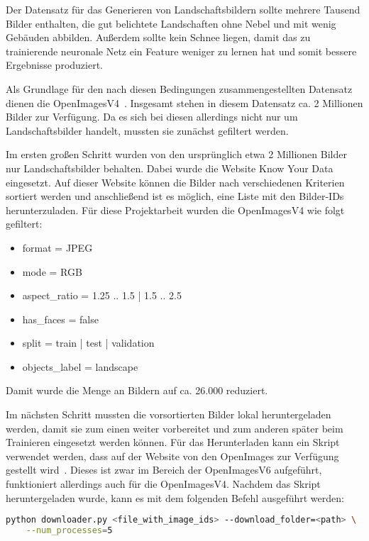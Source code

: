 Der Datensatz für das Generieren von Landschaftsbildern sollte mehrere Tausend
Bilder enthalten, die gut belichtete Landschaften ohne Nebel und mit wenig
Gebäuden abbilden. Außerdem sollte kein Schnee liegen, damit das zu trainierende
neuronale Netz ein Feature weniger zu lernen hat und somit bessere Ergebnisse
produziert.

Als Grundlage für den nach diesen Bedingungen zusammengestellten Datensatz
dienen die OpenImagesV4~\cite{OpenImages,OpenImages2}. Insgesamt stehen in
diesem Datensatz ca. 2 Millionen Bilder zur Verfügung. Da es sich bei diesen
allerdings nicht nur um Landschaftsbilder handelt, mussten sie zunächst
gefiltert werden. 

Im ersten großen Schritt wurden von den ursprünglich etwa 2 Millionen Bilder nur
Landschaftsbilder behalten. Dabei wurde die Website \glqq Know Your
Data\grqq~\cite{KYD:OIv4} eingesetzt. Auf dieser Website können die Bilder nach
verschiedenen Kriterien sortiert werden und anschließend ist es möglich, eine
Liste mit den Bilder-IDs herunterzuladen. Für diese Projektarbeit wurden die
OpenImagesV4 wie folgt gefiltert:

\begin{itemize}
	\item format = JPEG
	\item mode = RGB
	\item aspect\_ratio = 1.25 .. 1.5 | 1.5 .. 2.5
	\item has\_faces = false
	\item split = train | test | validation
	\item objects\_label = landscape
\end{itemize}

Damit wurde die Menge an Bildern auf ca. 26.000 reduziert.

Im nächsten Schritt mussten die vorsortierten Bilder lokal heruntergeladen
werden, damit sie zum einen weiter vorbereitet und zum anderen später beim
Trainieren eingesetzt werden können. Für das Herunterladen kann ein Skript
verwendet werden, dass auf der Website von den OpenImages zur Verfügung gestellt
wird~\cite{OIv4:Download}. Dieses ist zwar im Bereich der OpenImagesV6
aufgeführt, funktioniert allerdings auch für die OpenImagesV4. Nachdem das
Skript heruntergeladen wurde, kann es mit dem folgenden Befehl ausgeführt
werden:

\begin{lstlisting}[language=bash,caption={Download OpenImagesV4}]
	python downloader.py <file_with_image_ids> --download_folder=<path> \
	--num_processes=5
\end{lstlisting}

